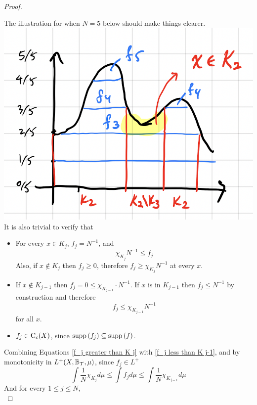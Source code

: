 \documentclass[../../main.tex]{subfiles}
\begin{document}
\begin{proof}
\begin{itemize}
    \end{itemize}
    The illustration for when $N=5$ below should make things clearer.\\
    \includegraphics[scale=0.50]{images/FollandTheorem7_2.png}
    \\ It is also trivial to verify that
    \begin{itemize}
        \item For every $x\in K_j$, $f_j=N^{-1}$, and
        \begin{equation}\label{f_j greater than K j}
        \chi_{K_{j}}N^{-1}\leq f_j
        \end{equation}
        Also, if $x\notin K_j$ then $f_j\geq 0$, therefore $f_j\geq \chi_{K_j}N^{-1}$ at every $x$.
        \item If $x\notin K_{j-1}$ then $f_j = 0\leq \chi_{K_{j-1}}\cdot N^{-1}$. If $x$ is in $K_{j-1}$ then $f_j\leq N^{-1}$ by construction and therefore
        \begin{equation}\label{f_j less than K j-1}
        f_j\leq \chi_{K_{j-1}}N^{-1}
        \end{equation}
        for all $x$.
        \item $f_j\in\operatorname{C}_c({X})$, since $\operatorname{supp}{(f_j)}\subseteq \operatorname{supp}{(f)}$.
    \end{itemize}
   Combining Equations \eqref{f_j greater than K j} with \eqref{f_j less than K j-1}, and by monotonicity in $L^+(X,\mathbb{B}_{\mathcal{T}},\mu)$, since $f_j\in L^+$
   \[
   \int \dfrac{1}{N}\chi_{K_j}d\mu\leq \int f_jd\mu\leq\int \dfrac{1}{N}\chi_{K_{j-1}}d\mu
   \]
   And for every $1\leq j\leq N$, 
   \begin{equation}\label{integral fj estimate}

\end{equation}
\end{proof}
\end{document}
